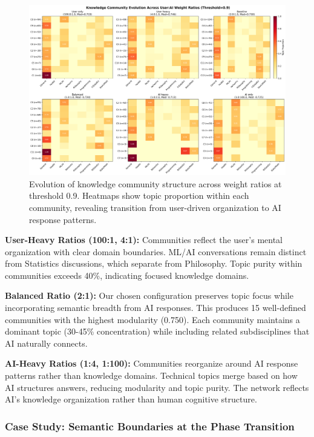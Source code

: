 \begin{figure}[h]
\centering
\includegraphics[width=\textwidth]{./images/community_topic_evolution.png}
\caption{Evolution of knowledge community structure across weight ratios at threshold 0.9. Heatmaps show topic proportion within each community, revealing transition from user-driven organization to AI response patterns.}
\label{fig:community_evolution}
\end{figure}

\textbf{User-Heavy Ratios (100:1, 4:1):} Communities reflect the user's mental organization with clear domain boundaries. ML/AI conversations remain distinct from Statistics discussions, which separate from Philosophy. Topic purity within communities exceeds 40\%, indicating focused knowledge domains.

\textbf{Balanced Ratio (2:1):} Our chosen configuration preserves topic focus while incorporating semantic breadth from AI responses. This produces 15 well-defined communities with the highest modularity (0.750). Each community maintains a dominant topic (30-45\% concentration) while including related subdisciplines that AI naturally connects.

\textbf{AI-Heavy Ratios (1:4, 1:100):} Communities reorganize around AI response patterns rather than knowledge domains. Technical topics merge based on how AI structures answers, reducing modularity and topic purity. The network reflects AI's knowledge organization rather than human cognitive structure.

\subsubsection{Case Study: Semantic Boundaries at the Phase Transition}

